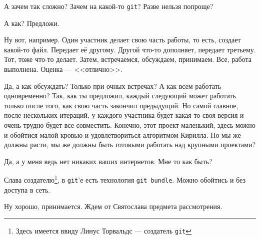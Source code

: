 \documentclass[14pt,a4paper]{article}
\begin{document}
 А зачем так сложно? Зачем на какой-то \texttt{git}? Разве нельзя попроще?

 А как? Предложи.

 Ну вот, например. Один участник делает свою часть работы, то есть, создает какой-то файл.
Передает её другому. Другой что-то дополняет, передает третьему. Тот, тоже что-то делает. Затем,
встречаемся, обсуждаем, принимаем. Все, работа выполнена. Оценка --- <<отлично>>.

 Да, а как обсуждать? Только при очных встречах? А как всем работать одновременно? Так, 
как ты предложил, каждый следующий может работать только после того, как свою часть закончил предыдущий.
Но самой главное, после нескольких итераций, у каждого участника будет какая-то своя версия и очень трудно
будет все совместить. Конечно, этот проект маленький, здесь можно и обойтися малой кровью и удовлетвориться
алгоритмом Кирилла. Но мы же должны расти, мы же должны быть готовыми работать над  крупными проектами?

 Да, а у меня ведь нет никаких ваших интернетов. Мне то как быть?

 Слава создателю\footnote{Здесь имеется ввиду Линус Торвальдс --- создатель \texttt{git}}, в \texttt{git}'е есть технология \texttt{git bundle}. Можно обойтись 
и без доступа в сеть. 

 Ну хорошо, принимается. Ждем от Святослава предмета рассмотрения. 
\end{document}
